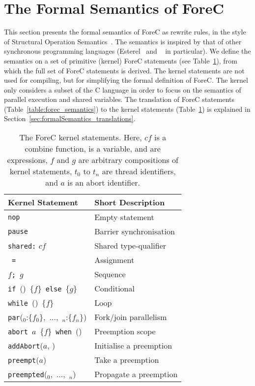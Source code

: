 \section{The Formal Semantics of ForeC}
\label{sec:formalSemantics}

This section presents the formal semantics of ForeC as rewrite rules,
in the style of Structural Operation Semantics~\cite{semantics_sos}. 
The semantics is inspired by that of other synchronous programming
languages (Esterel~\cite{EsterelV7} and \pretc{}~\cite{pret_pretc} in particular).
We define the semantics on a set of primitive (kernel) ForeC statements
(see Table~\ref{table:forec_kernel}), from which the full set of ForeC 
statements is derived. The kernel statements are not used for compiling, 
but for simplifying the formal definition of ForeC. The kernel only 
considers a subset of the C language in order to focus on the semantics 
of parallel execution and shared variables. The translation of ForeC 
statements (Table~\ref{table:forec_semantics}) to the kernel statements 
(Table~\ref{table:forec_kernel}) is explained in 
Section~\ref{sec:formalSemantics_translations}.

\begin{table}[!h]
	\centering
	\renewcommand{\arraystretch}{1.25}
	
	\begin{tabular}{l l}
		\bf{Kernel Statement}													& \bf{Short Description}		\\ \hline
		\verb$nop$																& Empty statement				\\
		\verb$pause$															& Barrier synchronisation		\\
		\verb$shared:$ $cf$														& Shared type-qualifier			\\
		\var{}~\verb$=$~\expression{}											& Assignment					\\
		$f$\verb$;$~$g$															& Sequence						\\
		\verb$if$~(\expression{})~\{$f$\}~\verb$else$~\{$g$\}					& Conditional					\\
		\verb$while$~(\expression{})~\{$f$\}									& Loop							\\
		\verb$par$(\thread{}$_0$:\{$f_0$\},~$\dots$,~\thread{}$_n$:\{$f_n$\})	& Fork/join parallelism			\\
		\verb$abort$~$a$~\{$f$\}~\verb$when$~(\expression{})					& Preemption scope				\\
		\verb$addAbort$($a$, \imm{})											& Initialise a preemption		\\
		\verb$preempt$($a$)														& Take a preemption				\\
		\verb$preempted$(\thread{}$_0$,~$\dots$,~\thread{}$_n$)					& Propagate a preemption		\\
	\end{tabular}
	
	\caption{The ForeC kernel statements. Here, $cf$ is a combine function, \var{} is a variable, 
			 \expression{} and \imm{} are expressions, $f$ and $g$ are arbitrary compositions of kernel 
			 statements, $t_0$ to $t_n$ are thread identifiers, and $a$ is an abort identifier.}
	\label{table:forec_kernel}
\end{table}

